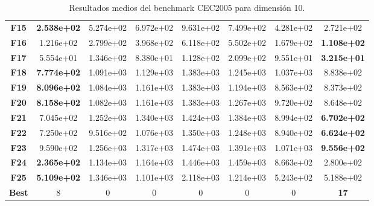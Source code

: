 \begin{table}
{\begin{tabular}{cccccccc}
		\textbf{F15}  &  \textbf{2.538e+02} &  5.274e+02 &  6.972e+02 &  9.631e+02 &  7.499e+02 &  4.281e+02 &  2.721e+02 \\
		\textbf{F16}  &  1.216e+02 &  2.799e+02 &  3.968e+02 &  6.118e+02 &  5.502e+02 &  1.679e+02 &  \textbf{1.108e+02} \\
		\textbf{F17}  &  5.554e+01 &  1.346e+02 &  8.380e+01 &  1.128e+02 &  2.099e+02 &  9.551e+01 &  \textbf{3.215e+01} \\
		\textbf{F18}  &  \textbf{7.774e+02} &  1.091e+03 &  1.129e+03 &  1.383e+03 &  1.245e+03 &  1.037e+03 &  8.838e+02 \\
		\textbf{F19}  &  \textbf{8.096e+02} &  1.084e+03 &  1.161e+03 &  1.383e+03 &  1.194e+03 &  8.563e+02 &  8.373e+02 \\
		\textbf{F20}  &  \textbf{8.158e+02} &  1.082e+03 &  1.161e+03 &  1.383e+03 &  1.267e+03 &  9.720e+02 &  8.648e+02 \\
		\textbf{F21}  &  7.045e+02 &  1.252e+03 &  1.340e+03 &  1.424e+03 &  1.384e+03 &  8.994e+02 &  \textbf{6.702e+02} \\
		\textbf{F22}  &  7.250e+02 &  9.516e+02 &  1.076e+03 &  1.350e+03 &  1.248e+03 &  8.940e+02 &  \textbf{6.624e+02} \\
		\textbf{F23}  &  9.590e+02 &  1.256e+03 &  1.317e+03 &  1.474e+03 &  1.391e+03 &  1.071e+03 &  \textbf{9.556e+02} \\
		\textbf{F24}  &  \textbf{2.365e+02} &  1.134e+03 &  1.164e+03 &  1.446e+03 &  1.459e+03 &  8.663e+02 &  2.800e+02 \\
		\textbf{F25}  &  \textbf{5.109e+02} &  1.346e+03 &  1.101e+03 &  2.118e+03 &  1.214e+03 &  5.243e+02 &  5.188e+02 \\
		\textbf{Best} &          8 &          0 &          0 &          0 &          0 &          0 &         \textbf{17} \\
		\bottomrule
\end{tabular}}
	\caption{Resultados medios del benchmark CEC2005 para dimensión 10.}
\end{table}

